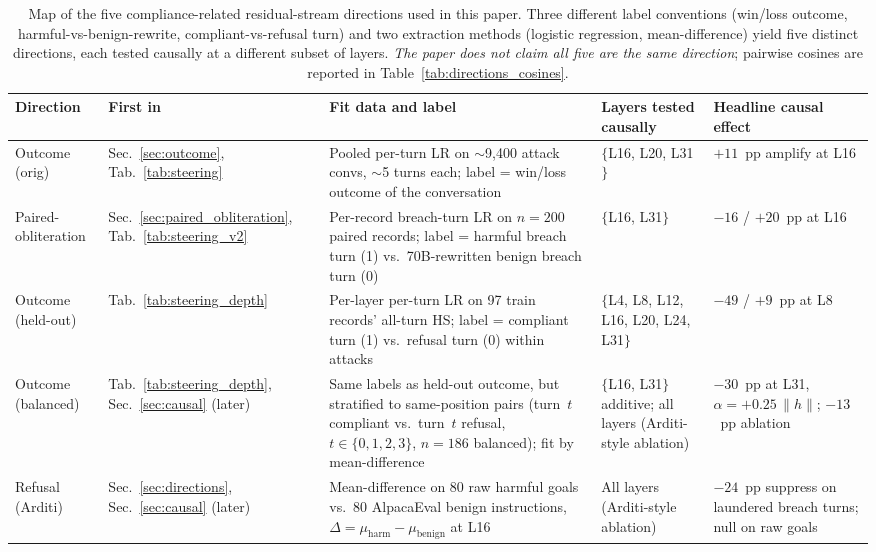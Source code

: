 \documentclass[11pt]{article}
\begin{document}
\begin{table}[h]
\centering
\small
\begin{tabular}{p{} p{} p{} p{} p{}}
\toprule
\textbf{Direction} & \textbf{First in} & \textbf{Fit data and label} & \textbf{Layers tested causally} & \textbf{Headline causal effect} \\
\midrule
Outcome (orig) & Sec.~\ref{sec:outcome}, Tab.~\ref{tab:steering} & Pooled per-turn LR on $\sim$9{,}400 attack convs, $\sim$5 turns each; label = win/loss outcome of the conversation & $\{$L16, L20, L31$\}$ & $+11$~pp amplify at L16 \\
\midrule
Paired-obliteration & Sec.~\ref{sec:paired_obliteration}, Tab.~\ref{tab:steering_v2} & Per-record breach-turn LR on $n{=}200$ paired records; label = harmful breach turn (1) vs.\ 70B-rewritten benign breach turn (0) & $\{$L16, L31$\}$ & $-16$ / $+20$~pp at L16 \\
\midrule
Outcome (held-out) & Tab.~\ref{tab:steering_depth} & Per-layer per-turn LR on 97 train records' all-turn HS; label = compliant turn (1) vs.\ refusal turn (0) within attacks & $\{$L4, L8, L12, L16, L20, L24, L31$\}$ & $-49$ / $+9$~pp at L8 \\
\midrule
Outcome (balanced) & Tab.~\ref{tab:steering_depth}, Sec.~\ref{sec:causal} (later) & Same labels as held-out outcome, but stratified to same-position pairs (turn~$t$ compliant vs.\ turn~$t$ refusal, $t \in \{0,1,2,3\}$, $n{=}186$ balanced); fit by mean-difference & $\{$L16, L31$\}$ additive; all layers (Arditi-style ablation) & $-30$~pp at L31, $\alpha{=}+0.25\,\|h\|$; $-13$~pp ablation \\
\midrule
Refusal (Arditi) & Sec.~\ref{sec:directions}, Sec.~\ref{sec:causal} (later) & Mean-difference on 80 raw harmful goals vs.\ 80 AlpacaEval benign instructions, $\Delta=\mu_{\text{harm}}{-}\mu_{\text{benign}}$ at L16 & All layers (Arditi-style ablation) & $-24$~pp suppress on laundered breach turns; null on raw goals \\
\bottomrule
\end{tabular}
\caption{Map of the five compliance-related residual-stream directions used in this paper. Three different label conventions (win/loss outcome, harmful-vs-benign-rewrite, compliant-vs-refusal turn) and two extraction methods (logistic regression, mean-difference) yield five distinct directions, each tested causally at a different subset of layers. \emph{The paper does not claim all five are the same direction}; pairwise cosines are reported in Table~\ref{tab:directions_cosines}.}
\label{tab:directions_map}
\end{table}
\end{document}
